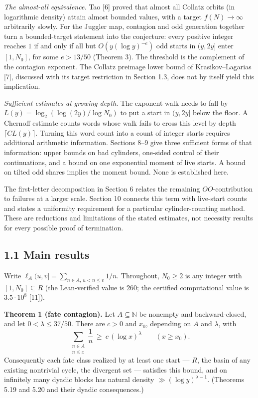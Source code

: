 \documentclass[11pt,a4paper]{article}
\begin{document}
\emph{The almost-all equivalence.} Tao {[}6{]} proved that almost all
Collatz orbits (in logarithmic density) attain almost bounded values,
with a target \(f(N)\to\infty\) arbitrarily slowly. For the Juggler map,
contagion and odd generation together turn a bounded-target statement
into the conjecture: every positive integer reaches \(1\) if and only if
all but \(O(y(\log y)^{-e})\) odd starts in \((y,2y]\) enter
\([1,N_0]\), for some \(e>13/50\) (Theorem 3). The threshold is the
complement of the contagion exponent. The Collatz preimage lower bound
of Krasikov--Lagarias {[}7{]}, discussed with its target restriction in
Section 1.3, does not by itself yield this implication.

\emph{Sufficient estimates at growing depth.} The exponent walk needs to
fall by \(L(y)=\log_2(\log(2y)/\log N_0)\) to put a start in \((y,2y]\)
below the floor. A Chernoff estimate counts words whose walk fails to
cross this level by depth \(\lceil CL(y)\rceil\). Turning this word
count into a count of integer starts requires additional arithmetic
information. Sections 8--9 give three sufficient forms of that
information: upper bounds on bad cylinders, one-sided control of their
continuations, and a bound on one exponential moment of live starts. A
bound on tilted odd shares implies the moment bound. None is established
here.

The first-letter decomposition in Section 6 relates the remaining
\(OO\)-contribution to failures at a larger scale. Section 10 connects
this term with live-start counts and states a uniformity requirement for
a particular cylinder-counting method. These are reductions and
limitations of the stated estimates, not necessity results for every
possible proof of termination.

\subsection{1.1 Main results}\label{main-results}

Write \(\ell_A(u,v]=\sum_{n\in A,\,u<n\le v}1/n\). Throughout,
\(N_0\ge2\) is any integer with \([1,N_0]\subseteq R\) (the
Lean-verified value is \(260\); the certified computational value is
\(3.5\cdot 10^8\) {[}11{]}).

\textbf{Theorem 1 (fate contagion).} Let \(A\subseteq\mathbb N\) be
nonempty and backward-closed, and let \(0<\lambda\le37/50\). There are
\(c>0\) and \(x_0\), depending on \(A\) and \(\lambda\), with \[
\sum_{\substack{n\in A\\ n\le x}}\frac1n\ \ge\ c\,(\log x)^{\lambda}
\qquad(x\ge x_0).
\] Consequently each fate class realized by at least one start ---
\(R\), the basin of any existing nontrivial cycle, the divergent set ---
satisfies this bound, and on infinitely many dyadic blocks has natural
density \(\gg(\log y)^{\lambda-1}\). (Theorems 5.19 and 5.20 and their
dyadic consequences.)
\end{document}
